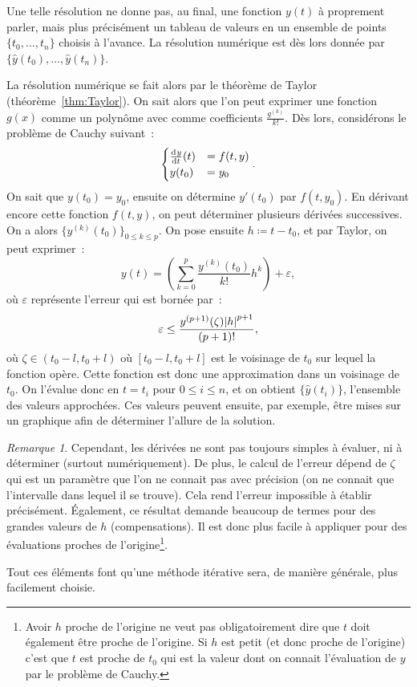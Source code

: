 \documentclass{article}
\theoremstyle{definition}
\theoremstyle{remark}
\newtheorem*{rmq}{Remarque}
\begin{document}
		Une telle résolution ne donne pas, au final, une fonction $y(t)$ à proprement parler, mais plus précisément un tableau de valeurs en un ensemble de
		points $\{t_0, \dotsc, t_n\}$ choisis à l'avance. La résolution numérique est dès lors donnée par $\{\widehat y(t_0), \dotsc, \widehat y(t_n)\}$.

		La résolution numérique se fait alors par le théorème de Taylor (théorème~\ref{thm:Taylor}). On sait alors que l'on peut exprimer une fonction $g(x)$
		comme un polynôme avec comme coefficients $\frac {g^{(k)}}{k!}$. Dès lors, considérons le problème de Cauchy suivant~:
		\[\begin{cases}\od yt(t) &= f(t, y) \\y(t_0) &= y_0\end{cases}.\]
		On sait que $y(t_0) = y_0$, ensuite on détermine $y'(t_0)$ par $f(t, y_0)$. En dérivant encore cette fonction $f(t, y)$, on peut déterminer plusieurs
		dérivées successives. On a alors $\{y^{(k)}(t_0)\}_{0 \leq k \leq p}$. On pose ensuite $h \coloneqq t-t_0$, et par Taylor, on peut exprimer~:
		\[y(t) = \left(\sum_{k=0}^p\frac {y^{(k)}(t_0)}{k!}h^k\right) + \varepsilon,\]
		où $\varepsilon$ représente l'erreur qui est bornée par~:
		\[\varepsilon \leq \frac {y^{(p+1)}(\zeta)\abs h^{p+1}}{(p+1)!},\]
		où $\zeta \in (t_0-l, t_0+l)$ où $[t_0-l, t_0+l]$ est le voisinage de $t_0$ sur lequel la fonction opère. Cette fonction est donc une approximation
		dans un voisinage de $t_0$. On l'évalue donc en $t = t_i$ pour $0 \leq i \leq n$, et on obtient $\{\widehat y(t_i)\}$, l'ensemble des valeurs
		approchées. Ces valeurs peuvent ensuite, par exemple, être mises sur un graphique afin de déterminer l'allure de la solution.

		\begin{rmq} Cependant, les dérivées ne sont pas toujours simples à évaluer, ni à déterminer (surtout numériquement). De plus, le calcul de l'erreur
		dépend de $\zeta$ qui est un paramètre que l'on ne connait pas avec précision (on ne connait que l'intervalle dans lequel il se trouve). Cela rend
		l'erreur impossible à établir précisément. Également, ce résultat demande beaucoup de termes pour des grandes valeurs de $h$ (compensations). Il est
		donc plus facile à appliquer pour des évaluations proches de l'origine\footnote{Avoir $h$ proche de l'origine ne veut pas obligatoirement dire que $t$
		doit également être proche de l'origine. Si $h$ est petit (et donc proche de l'origine) c'est que $t$ est proche de $t_0$ qui est la valeur dont on
		connait l'évaluation de $y$ par le problème de Cauchy.}.

		Tout ces éléments font qu'une méthode itérative sera, de manière générale, plus facilement choisie.
		\end{rmq}
\end{document}

